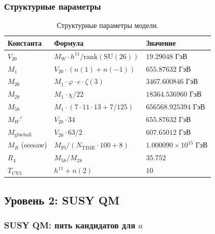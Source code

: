 \documentclass[11pt,a4paper]{article}
\newcommand{\SU}{\ensuremath{\mathrm{SU}}}
\theoremstyle{definition}
\begin{document}
\subsubsection{Структурные параметры}

\begin{table}[ht]
\centering
\caption{Структурные параметры модели.}
\label{tab:app-structural}
\begin{tabular}{lll}
\toprule
Константа & Формула & Значение \\
\midrule
$V_{20}$ & $M_W \cdot h^{11}/\text{rank}(\SU(26))$ & $19.29048$ ГэВ \\
$M_1$ & $V_{20} \cdot (n(1) + n(-1))$ & $655.87632$ ГэВ \\
$M_{26}$ & $M_1 \cdot \varphi \cdot e \cdot \zeta(3)$ & $3467.600846$ ГэВ \\
$M_{28}$ & $M_1 \cdot \chi/22$ & $18364.536960$ ГэВ \\
$M_{58}$ & $M_1 \cdot (7 \cdot 11 \cdot 13 + 7/125)$ & $656568.925394$ ГэВ \\
$M_W'$ & $V_{20} \cdot 34$ & $655.87632$ ГэВ \\
$M_{\text{glueball}}$ & $V_{20} \cdot 63/2$ & $607.65012$ ГэВ \\
$M_R$ (seesaw) & $M_{\text{Pl}}/(N_{\text{TIME}} \cdot 100 + 8)$ & $1.000090 \times 10^{15}$ ГэВ \\
$R_4$ & $M_{58}/M_{28}$ & $35.752$ \\
$T_{\text{CY3}}$ & $h^{11} + n(2)$ & $10$ \\
\bottomrule
\end{tabular}
\end{table}

\subsection{Уровень 2: SUSY QM}
\label{app:level-2-susy}

\subsubsection{SUSY QM: пять кандидатов для \texorpdfstring{$a$}{a}}
\end{document}
